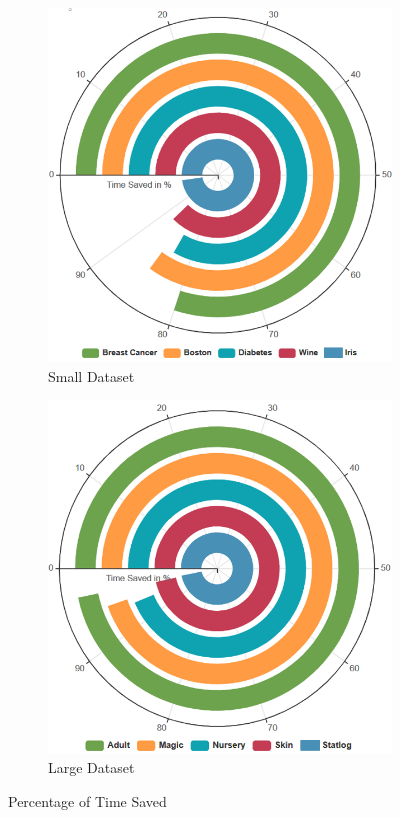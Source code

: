 \begin{figure}[H]
\centering
\begin{subfigure}{8cm}
  \centering
  \includegraphics[width=\linewidth]{images/Percetnage Small Datasets.png}
  \caption{Small Dataset}
  \label{fig:small_dataset_time_Saved}
\end{subfigure}%
\begin{subfigure}{8cm}
  \centering
  \includegraphics[width=\linewidth]{images/Percentage Large Datasets.png}
  \caption{Large Dataset}
  \label{fig:large_dataset_time_saved}
\end{subfigure}
\caption{Percentage of Time Saved}
\label{fig:percentage_time_saved}
\end{figure}


